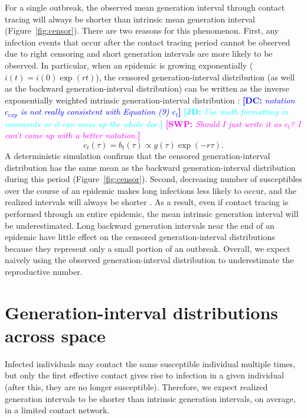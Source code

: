 \documentclass[12pt]{article}
\newcommand{\comment}[3]{\textcolor{#1}{\textbf{[#2: }\textsl{#3}\textbf{]}}}
\newcommand{\jd}[1]{\comment{cyan}{JD}{#1}}
\newcommand{\swp}[1]{\comment{magenta}{SWP}{#1}}
\newcommand{\dc}[1]{\comment{blue}{DC}{#1}}
\begin{document}
For a single outbreak, the observed mean generation interval through contact tracing will always be shorter than intrinsic mean generation interval (Figure~\ref{fig:censor}).
There are two reasons for this phenomenon.
First, any infection events that occur after the contact tracing period cannot be observed due to right censoring and short generation intervals are more likely to be observed.
In particular, when an epidemic is growing exponentially ($i(t) = i(0) \exp(rt)$), 
the censored generation-interval distribution (as well as the backward generation-interval distribution) can be written as the inverse exponentially weighted intrinsic generation-interval distribution \citep{britton2019estimation}:
\dc{notation $c_{exp}$ is not really consistent with Equation (9) $c_t$}
\jd{Use math formatting in comments or it can mess up the whole doc.}
\swp{Should I just write it as $c_t$? I can't come up with a better notation.}
\begin{equation}
c_t(\tau) = b_t(\tau) \propto g(\tau) \exp(-r\tau).
\label{eq:exp}
\end{equation}
A deterministic simulation confirms that the censored generation-interval distribution has the same mean as the backward generation-interval distribution during this period (Figure~\ref{fig:censor}).
Second, decreasing number of susceptibles over the course of an epidemic makes long infections less likely to occur, and the realized intervals will always be shorter \citep{champredon2015intrinsic}.
As a result, even if contact tracing is performed through an entire epidemic, the mean intrinsic generation interval will be underestimated.
Long backward generation intervals near the end of an epidemic have little effect on the censored generation-interval distributions because they represent only a small portion of an outbreak.
Overall, we expect naively using the observed generation-interval distribution to underestimate the reproductive number.


\section{Generation-interval distributions across space}

Infected individuals may contact the same susceptible individual multiple times, but only the first effective contact gives rise to infection in a given individual (after this, they are no longer susceptible).
Therefore, we expect realized generation intervals to be shorter than intrinsic generation intervals, on average, in a limited contact network.
\end{document}
